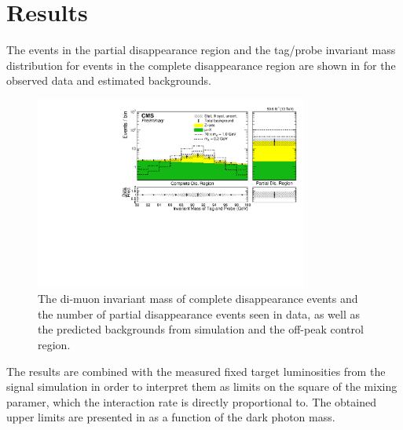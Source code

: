 \chapter{Results}
\label{results}

The events in the partial disappearance region and the tag/probe invariant mass distribution for events in the complete disappearance region are shown in  for the observed data and estimated backgrounds.

\begin{figure}[htbp]
	\centering
	\includegraphics[width=0.8\textwidth]{figures/bdtScore_partialDisappearanceBDT_0p2.pdf}
	\caption[Observed Signal Region Events]{The di-muon invariant mass of complete disappearance events and the number of partial disappearance events seen in data, as well as the predicted backgrounds from simulation and the off-peak control region.}
	\label{fig:invMassResult}
\end{figure}

The results are combined with the measured fixed target luminosities from the signal simulation in order to interpret them as limits on the square of the mixing paramer, which the \dbrem interaction rate is directly proportional to.
The obtained upper limits are presented in  as a function of the dark photon mass. 

